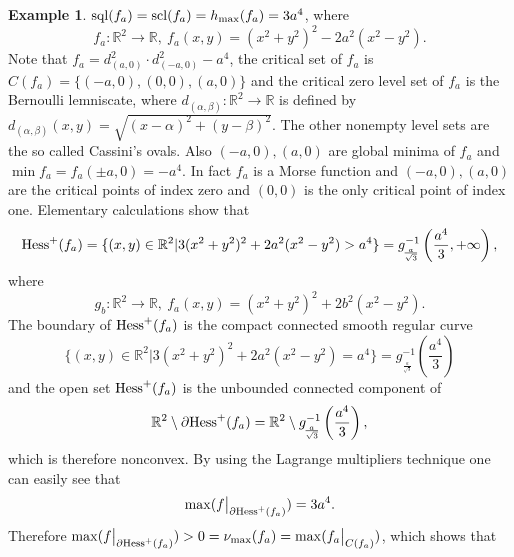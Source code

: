 \documentclass[12pt,twoside,reqno]{amsart}
\theoremstyle{definition}
\newtheorem{example}{Example}[section]
\numberwithin{equation}{section}
\begin{document}
\begin{example}
${\rm sql}(f_a)={\rm scl}(f_a)=h_{\max}(f_a)=3a^4$, where \[f_a:\mathbb{R}^2\longrightarrow\mathbb{R}, \ f_a(x,y)=(x^2+y^2)^2-2a^2(x^2-y^2).\] 
Note that $f_a=d_{(a,0)}^2\cdot d_{(-a,0)}^2-a^4$, the critical set of 
$f_a$ is $C(f_a)=\{(-a,0),(0,0),(a,0)\}$ and the critical zero level set of $f_a$ is the Bernoulli lemniscate,
where $d_{(\alpha,\beta)}:\mathbb{R}^2\longrightarrow\mathbb{R}$ is defined by $d_{(\alpha,\beta)}(x,y)=\sqrt{(x-\alpha)^2+(y-\beta)^2}$. 
The other nonempty level sets are the so called Cassini's ovals.
Also $(-a,0),(a,0)$ are global minima of $f_a$ and $\min f_a=f_a(\pm a,0)=-a^4$. 
In fact $f_a$ is a Morse function and $(-a,0),(a,0)$ are the critical points of index zero and $(0,0)$ is the only critical point of index one. 
Elementary calculations \cite{PiTo} show that 
\[
{\rm Hess}^+(f_a)=\{(x,y)\in\mathbb{R}^2 | 3(x^2+y^2)^2+2a^2(x^2-y^2)>a^4\}=g_{_{\!\frac{a}{\sqrt{3}}}}^{-1}\left(\frac{a^4}{3},+\infty\right),
\]
where 
\[g_b:\mathbb{R}^2\longrightarrow\mathbb{R}, \ f_a(x,y)=(x^2+y^2)^2+2b^2(x^2-y^2).\]
The boundary of ${\rm Hess}^+(f_a)$ is the compact connected smooth regular curve
\[
\{(x,y)\in\mathbb{R}^2 | 3(x^2+y^2)^2+2a^2(x^2-y^2)=a^4\}=g_{_{\!\frac{a}{\sqrt{3}}}}^{-1}\left(\frac{a^4}{3}\right)
\]
and the open set ${\rm Hess}^+(f_a)$ is the unbounded connected component of 
\[\mathbb{R}^2\setminus\partial{\rm Hess}^+(f_a)=\mathbb{R}^2\setminus g_{_{\!\frac{a}{\sqrt{3}}}}^{-1}\left(\frac{a^4}{3}\right),\] which is therefore nonconvex.
By using the Lagrange multipliers technique one can easily see that
\[\max(f\big|_{\partial {\rm Hess}^+(f_a)})=3a^4.\] 
Therefore
$\max(f\big|_{\partial {\rm Hess}^+(f_a)})>0=\nu_{\max}(f_a)=\max(f_a\big|_{C(f_a)})$, which shows that

\end{example}
\end{document}
